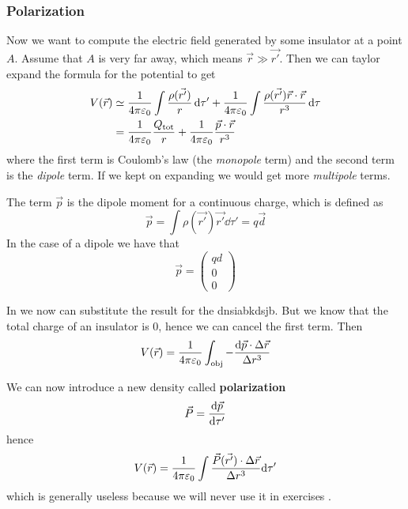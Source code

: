 \documentclass[12pt]{extarticle}
\begin{document}
\subsubsection{Polarization}

Now we want to compute the electric field generated by some insulator at a point $A$.
Assume that $A$ is very far away, which means $\vec r \gg \vec{r'}$.
Then we can taylor expand the formula for the potential to get
\begin{align}
    V(\vec r) & \simeq \frac{1}{4 \pi \varepsilon_0} \int \frac{\rho(\vec{r'})}{r} \dd{\tau '} + \frac{1}{4 \pi \varepsilon_0} \int \frac{\rho (\vec{r'}) \vec r \cdot \vec r}{r^3} \dd{\tau} \\
              & = \frac{1}{4 \pi \varepsilon_0} \frac{Q_\text{tot}}{r} + \frac{1}{4 \pi \varepsilon_0} \frac{\vec p \cdot \vec r}{r^3} \label{eq:potential-insulator}
\end{align}
where the first term is Coulomb's law (the \emph{monopole} term) and the second term is the \emph{dipole} term.
If we kept on expanding we would get more \emph{multipole} terms.

The term $\vec p$ is the dipole moment for a continuous charge, which is defined as
\begin{equation}
    \vec p = \int \rho (\vec{r'}) \vec{r'} \dd{\tau '} = q \vec d
\end{equation}
In the case of a dipole we have that
\begin{equation}
    \vec p = \begin{pmatrix}
        qd \\ 0 \\ 0
    \end{pmatrix}
\end{equation}

In  we now can substitute the result for the dnsiabkdsjb.
But we know that the total charge of an insulator is $0$, hence we can cancel the first term.
Then
\begin{equation}
    V(\vec r) = \frac{1}{4 \pi \varepsilon_0} \int_\text{obj} -\frac{\dd \vec p \cdot \Delta \vec r}{\Delta r ^3}
\end{equation}

We can now introduce a new density called \textbf{polarization}
\begin{equation}
    \vec P = \dv{\vec p}{\tau '}
\end{equation}
hence
\begin{equation}
    V(\vec r) = \frac{1}{4 \pi \varepsilon_0} \int \frac{\vec P(\vec{r'}) \cdot \Delta \vec r}{ \Delta r^3} \dd \tau'
\end{equation}
which is generally useless because we will never use it in exercises .
\end{document}
